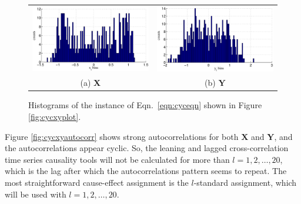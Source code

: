 \documentclass{article}[10pt]
\begin{document}
\begin{figure}[ht]
\begin{tabular}{cc}
\includegraphics[scale=0.5]{NoisyCyclicResponseExample_Xhist.eps} & \includegraphics[scale=0.5]{NoisyCyclicResponseExample_Yhist.eps} \\
(a) $\mathbf{X}$ & (b) $\mathbf{Y}$
\end{tabular}
\caption{Histograms of the instance of Eqn.\ \ref{eqn:cyceqn} shown in Figure \ref{fig:cycxyplot}.}
\label{fig:cycxyhist}
\end{figure}

Figure \ref{fig:cycxyautocorr} shows strong autocorrelations for both $\mathbf{X}$ and $\mathbf{Y}$, and the autocorrelations appear cyclic.  So, the leaning and lagged cross-correlation time series causality tools will not be calculated for more than $l=1,2,\ldots,20$, which is the lag after which the autocorrelations pattern seems to repeat.  The most straightforward cause-effect assignment is the $l$-standard assignment, which will be used with $l = 1,2,\ldots,20$. 
\end{document}
